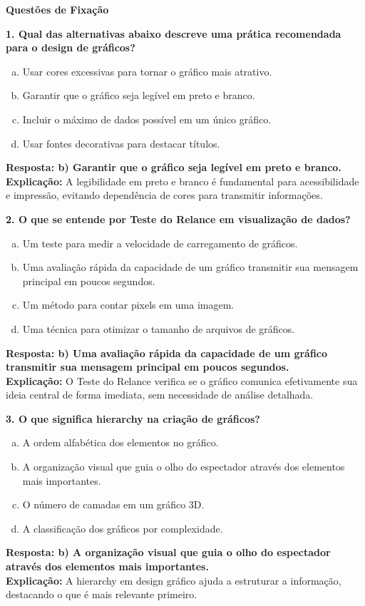 \begin{SolvedBox}[orange]
\textbf{Questões de Fixação}

\textbf{1. Qual das alternativas abaixo descreve uma prática recomendada para o design de gráficos?}

\begin{enumerate}[a)]
  \item Usar cores excessivas para tornar o gráfico mais atrativo.
  \item Garantir que o gráfico seja legível em preto e branco.
  \item Incluir o máximo de dados possível em um único gráfico.
  \item Usar fontes decorativas para destacar títulos.
\end{enumerate}

\textbf{Resposta: b) Garantir que o gráfico seja legível em preto e branco.} \\
\textbf{Explicação:} A legibilidade em preto e branco é fundamental para acessibilidade e impressão, evitando dependência de cores para transmitir informações.

\textbf{2. O que se entende por Teste do Relance em visualização de dados?}

\begin{enumerate}[a)]
  \item Um teste para medir a velocidade de carregamento de gráficos.
  \item Uma avaliação rápida da capacidade de um gráfico transmitir sua mensagem principal em poucos segundos.
  \item Um método para contar pixels em uma imagem.
  \item Uma técnica para otimizar o tamanho de arquivos de gráficos.
\end{enumerate}

\textbf{Resposta: b) Uma avaliação rápida da capacidade de um gráfico transmitir sua mensagem principal em poucos segundos.} \\
\textbf{Explicação:} O Teste do Relance verifica se o gráfico comunica efetivamente sua ideia central de forma imediata, sem necessidade de análise detalhada.

\textbf{3. O que significa hierarchy na criação de gráficos?}

\begin{enumerate}[a)]
  \item A ordem alfabética dos elementos no gráfico.
  \item A organização visual que guia o olho do espectador através dos elementos mais importantes.
  \item O número de camadas em um gráfico 3D.
  \item A classificação dos gráficos por complexidade.
\end{enumerate}

\textbf{Resposta: b) A organização visual que guia o olho do espectador através dos elementos mais importantes.} \\
\textbf{Explicação:} A hierarchy em design gráfico ajuda a estruturar a informação, destacando o que é mais relevante primeiro.
\end{SolvedBox}
